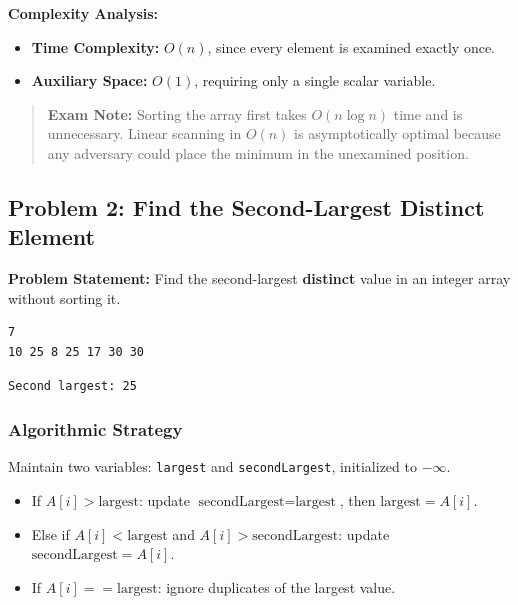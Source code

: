 \textbf{Complexity Analysis:}
\begin{itemize}
    \item \textbf{Time Complexity:} $O(n)$, since every element is examined exactly once.
    \item \textbf{Auxiliary Space:} $O(1)$, requiring only a single scalar variable.
\end{itemize}

\begin{quote}
\textbf{Exam Note:} Sorting the array first takes $O(n \log n)$ time and is unnecessary. Linear scanning in $O(n)$ is asymptotically optimal because any adversary could place the minimum in the unexamined position.
\end{quote}

\subsection{Problem 2: Find the Second-Largest Distinct Element}

\textbf{Problem Statement:} Find the second-largest \textbf{distinct} value in an integer array without sorting it.

\begin{lstlisting}[style=pseudocode, caption={Input}]
7
10 25 8 25 17 30 30
\end{lstlisting}

\begin{lstlisting}[style=pseudocode, caption={Expected Output}]
Second largest: 25
\end{lstlisting}

\subsubsection*{Algorithmic Strategy}
Maintain two variables: \texttt{largest} and \texttt{secondLargest}, initialized to $-\infty$.
\begin{itemize}
    \item If $A[i] > \text{largest}$: update $\text{secondLargest} = \text{largest}$, then $\text{largest} = A[i]$.
    \item Else if $A[i] < \text{largest}$ and $A[i] > \text{secondLargest}$: update $\text{secondLargest} = A[i]$.
    \item If $A[i] == \text{largest}$: ignore duplicates of the largest value.
\end{itemize}

